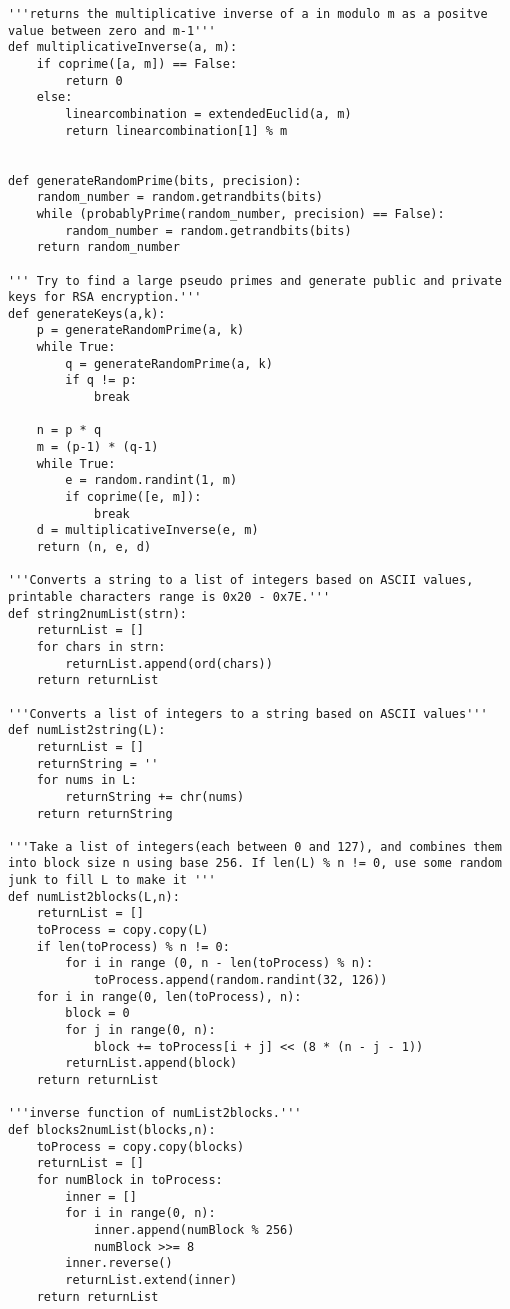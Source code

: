 \documentclass[a4paper,11pt]{article}
\theoremstyle{mytheor}
\begin{document}
\begin{lstlisting}[caption=RSA utilizando Miller Rabin em Python.]
'''returns the multiplicative inverse of a in modulo m as a positve value between zero and m-1'''
def multiplicativeInverse(a, m):
    if coprime([a, m]) == False:
        return 0
    else:
        linearcombination = extendedEuclid(a, m)
        return linearcombination[1] % m


def generateRandomPrime(bits, precision):
    random_number = random.getrandbits(bits)
    while (probablyPrime(random_number, precision) == False):
        random_number = random.getrandbits(bits)
    return random_number

''' Try to find a large pseudo primes and generate public and private keys for RSA encryption.'''
def generateKeys(a,k):
    p = generateRandomPrime(a, k)
    while True:
        q = generateRandomPrime(a, k)
        if q != p:
            break
    
    n = p * q
    m = (p-1) * (q-1)
    while True:
        e = random.randint(1, m)
        if coprime([e, m]):
            break
    d = multiplicativeInverse(e, m)
    return (n, e, d)

'''Converts a string to a list of integers based on ASCII values, printable characters range is 0x20 - 0x7E.'''
def string2numList(strn):
    returnList = []
    for chars in strn:
        returnList.append(ord(chars))
    return returnList

'''Converts a list of integers to a string based on ASCII values'''
def numList2string(L):
    returnList = []
    returnString = ''
    for nums in L:
        returnString += chr(nums)
    return returnString

'''Take a list of integers(each between 0 and 127), and combines them into block size n using base 256. If len(L) % n != 0, use some random junk to fill L to make it '''
def numList2blocks(L,n):
    returnList = []
    toProcess = copy.copy(L)
    if len(toProcess) % n != 0:
        for i in range (0, n - len(toProcess) % n):
            toProcess.append(random.randint(32, 126))
    for i in range(0, len(toProcess), n):
        block = 0
        for j in range(0, n):
            block += toProcess[i + j] << (8 * (n - j - 1))
        returnList.append(block)
    return returnList

'''inverse function of numList2blocks.'''
def blocks2numList(blocks,n):
    toProcess = copy.copy(blocks)
    returnList = []
    for numBlock in toProcess:
        inner = []
        for i in range(0, n):
            inner.append(numBlock % 256)
            numBlock >>= 8
        inner.reverse()
        returnList.extend(inner)
    return returnList


\end{lstlisting}
\end{document}
